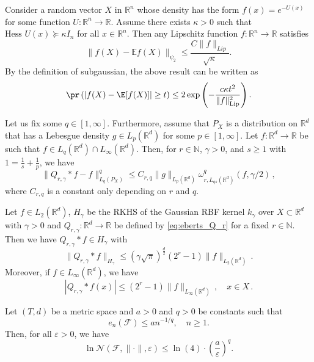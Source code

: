 \begin{theorem}\label{thm:exponential_density_concentration}
    Consider a random vector $X$ in $\mathbb{R}^n$ whose density has the form $f(x) = e^{-U(x)}$ for some function $U : \mathbb{R}^n \to \mathbb{R}$. Assume there exists $\kappa > 0$ such that $\text{Hess } U(x) \succeq \kappa I_n$ for all $x \in \mathbb{R}^n$. Then any Lipschitz function $f : \mathbb{R}^n \to \mathbb{R}$ satisfies
\[
\|f(X) - \mathbb{E} f(X)\|_{\psi_2} \leq \frac{C\|f\|_{Lip}}{\sqrt{\kappa}}.
\]
By the definition of subgaussian, the above result can be written as 
$$\pr\left(\left|f(X)-\E[f(X)]\right|\geq t\right)\leq 2\exp\left(-\frac{c\kappa t^2}{\|f\|^2_{\mathrm{Lip}}}\right).$$

\end{theorem}

 \begin{theorem}\label{thm:thm2.2_eberts} 
Let us fix some $q \in [1, \infty]$. Furthermore, assume that $P_X$ is a distribution on $\mathbb{R}^d$ that has a Lebesgue density $g \in L_p(\mathbb{R}^d)$ for some $p \in [1, \infty]$. Let $f : \mathbb{R}^d \to \mathbb{R}$ be such that $f \in L_q(\mathbb{R}^d) \cap L_\infty(\mathbb{R}^d)$. Then, for $r \in \mathbb{N}$, $\gamma > 0$, and $s \ge 1$ with $1 = \frac{1}{s} + \frac{1}{p}$, we have
\[
\|Q_{r,\gamma} * f - f\|_{L_q(P_X)}^q \le C_{r,q} \|g\|_{L_p(\mathbb{R}^d)} \omega_{r,L_{qs}(\mathbb{R}^d)}^q(f, \gamma/2) \, ,
\]
where $C_{r,q}$ is a constant only depending on $r$ and $q$.
     
 \end{theorem}


  \begin{theorem}\label{thm:thm2.3_eberts}
     Let $f \in L_2(\mathbb{R}^d)$, $H_{\gamma}$ be the RKHS of the Gaussian RBF kernel $k_{\gamma}$ over $X \subset \mathbb{R}^d$ with $\gamma > 0$ and $Q_{r,\gamma} : \mathbb{R}^d \to \mathbb{R}$ be defined by \eqref{eq:eberts_Q_r} for a fixed $r \in \mathbb{N}$. Then we have $Q_{r,\gamma} * f \in H_{\gamma}$ with
\[
\|Q_{r,\gamma} * f\|_{H_{\gamma}} \le (\gamma\sqrt{\pi})^{\frac{d}{2}}(2^r - 1)\|f\|_{L_2(\mathbb{R}^d)} \, .
\]
Moreover, if $f \in L_\infty(\mathbb{R}^d)$, we have
\[
|Q_{r,\gamma} * f(x)| \le (2^r - 1)\|f\|_{L_\infty(\mathbb{R}^d)} \, , \quad x \in X \, .
\]
 \end{theorem}

\begin{theorem}\label{thm:equivalence_covering_entropy} Let $(T,d)$ be a metric space and $a > 0$ and $q > 0$ be constants such that
\[
e_n(\mathcal{F}) \leq an^{-1/q}, \quad n \geq 1.
\]
Then, for all $\varepsilon > 0$, we have
\[
\ln \mathcal{N}(\mathcal{F},\|\cdot\|,\varepsilon) \leq \ln(4) \cdot \left(\frac{a}{\varepsilon}\right)^q.
\]

\end{theorem}

